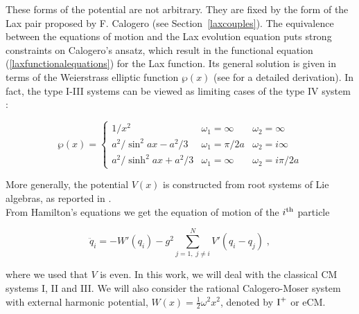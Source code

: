 These forms of the potential are not arbitrary. They are fixed by the form of the Lax pair proposed by F. Calogero (see Section~\ref{laxcouples}). The equivalence between the equations of motion and the Lax evolution equation puts strong constraints on Calogero's ansatz, which result in the functional equation (\ref{laxfunctionalequations}) for the Lax function. Its general solution is given in terms of the Weierstrass elliptic function $\wp(x)$ (see \cite{calogero2003classical} for a detailed derivation). In fact, the type I-III systems can be viewed as limiting cases of the type IV system \cite{ruijsenaars1999systems}:

\begin{equation}
    \wp(x) = \left \{ \begin{array}{ccc}
    {1}/{x^2} & \omega_1 = \infty & \omega_2 = \infty\\
    {a^2}/{\sin^2{ax}} - {a^2}/{3} & \omega_1 = {\pi} / {2a} & \omega_2 = i\infty\\
    {a^2}/{\sinh^2{ax}} + {a^2}/{3} & \omega_1 = \infty\ & \omega_2 = {i\pi}/{2a}
\end{array}
\right.
\end{equation}

More generally, the potential $V(x)$ is constructed from root systems of Lie algebras, as reported in \cite{perelomov1989}. \\
From Hamilton's equations we get the equation of motion of the $i^{\textnormal{th}}$ particle

\begin{equation}
    \ddot q_i = - W'(q_i) - g^2 \sum_{j = 1,\;j \neq i}^N V'(q_i - q_j)\;,
\end{equation}

where we used that $V$ is even. In this work, we will deal with the classical CM systems I, II and III. We will also consider the rational Calogero-Moser system with external harmonic potential, $W(x) = \frac{1}{2}\omega^2 x^2$, denoted by $\textnormal{I}^+$ or eCM.

